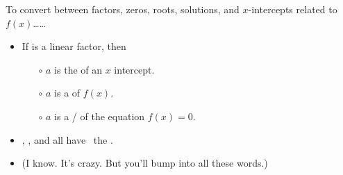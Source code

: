 \begin{myConcept}{To convert between factors, zeros, roots, solutions, and $x$-intercepts related to $f(x)$\dots\dots}
\begin{itemize}[fullwidth]
    \item If  is a linear factor, then 
    \begin{itemize}
        \item[$\circ$] $a$ is the  of an $x$ intercept.
        \item[$\circ$] $a$ is a  of $f(x)$.
        \item[$\circ$] $a$ is a / of the equation $f(x)=0$.
    \end{itemize}
\end{itemize}
\end{myConcept}

\begin{tcolorbox}[center,width=6in]
    \begin{itemize}
        \item {}, , and  all have \
        the  .
        \item (I know. It's crazy. But you'll bump into all these words.)
    \end{itemize}
\end{tcolorbox}

